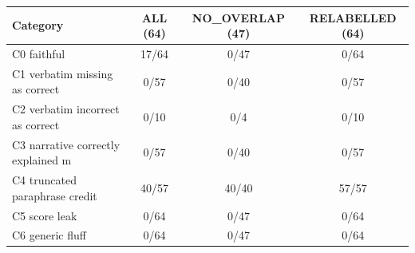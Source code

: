 \begin{tabular}{lccc}
\toprule
Category & ALL (64) & NO\_OVERLAP (47) & RELABELLED (64)\\
\midrule
C0 faithful & 17/64 & 0/47 & 0/64 \\
C1 verbatim missing as correct & 0/57 & 0/40 & 0/57 \\
C2 verbatim incorrect as correct & 0/10 & 0/4 & 0/10 \\
C3 narrative correctly explained m & 0/57 & 0/40 & 0/57 \\
C4 truncated paraphrase credit & 40/57 & 40/40 & 57/57 \\
C5 score leak & 0/64 & 0/47 & 0/64 \\
C6 generic fluff & 0/64 & 0/47 & 0/64 \\
\bottomrule
\end{tabular}

